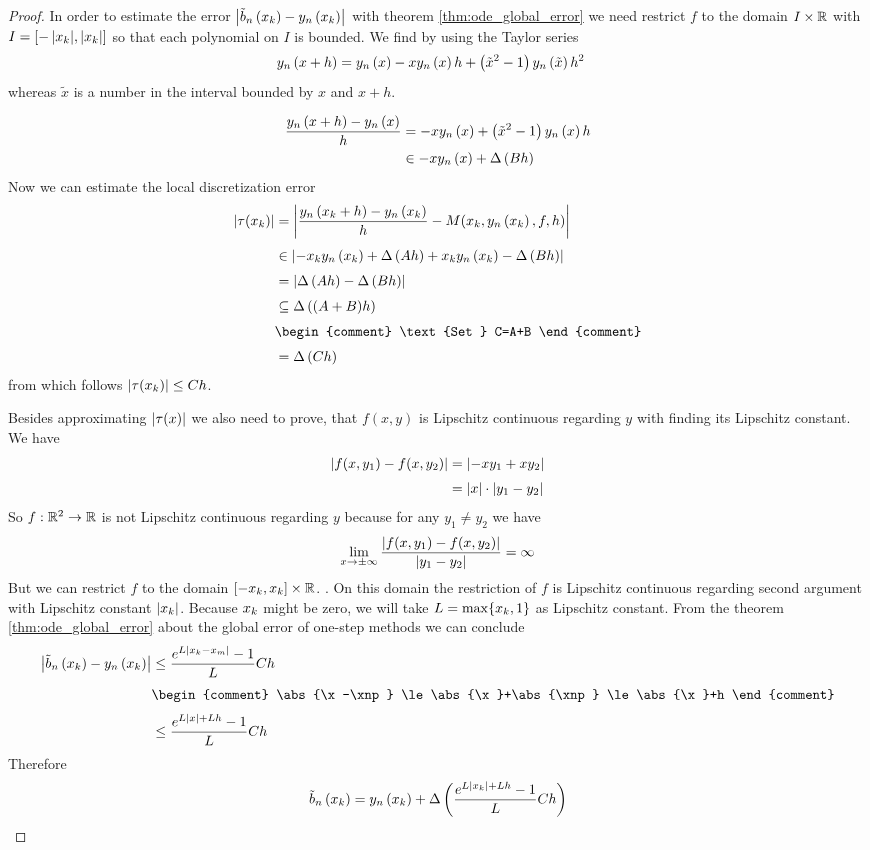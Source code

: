 \begin{proof}
  In order to estimate the error $\left|{\tilde b_{n}\left({x_{k}}\right)-y_{n}\left({x_{k}}\right)}\right|$ with theorem \ref{thm:ode_global_error} we need restrict $f$ to the domain $I\times \mathbb R$ with $I=\left[{-\left|{x_{k}}\right|},{\left|{x_{k}}\right|}\right]$ so that each polynomial on $I$ is bounded. We find by using the Taylor series
  \begin{align}
    & y_{n}\left({x+h}\right) = y_{n}\left({x}\right) -xy_{n}\left({x}\right)h+\left( {\tilde x^2-1} \right)y_{n}\left({\tilde x}\right) h^2
  \end{align}
  whereas $\tilde x$ is a number in the interval bounded by $x$ and $x+h$.

  \begin{align}
    \frac{y_{n}\left({x+h}\right)-y_{n}\left({x}\right)}h &= -xy_{n}\left({x}\right)+\left( {\tilde x^2-1} \right)y_{n}\left({x}\right) h \\
    &\in -xy_{n}\left({x}\right) + \Delta\left( {Bh} \right)
  \end{align}
  Now we can estimate the local discretization error
  \begin{align}
    \abs{\tau(\x)} &= \abs{\frac{\phin{\x[k]+h}-\phin{\x}}h -  M(\x,\phin{\x},f,h)} \nl
    &\in \abs{-\x\phin{\x} + \bigabs{Ah} +\x\phin{\x} - \bigabs{Bh}} \nl
    &= \abs{\bigabs{Ah}-\bigabs{Bh}} \nl
    &\subseteq \bigabs{(A+B)h} \nl
    &
    \begin{comment}
      \text{Set } C=A+B
    \end{comment} \nl
    &= \bigabs{Ch}
  \end{align}
  from which follows $\left|{\tau(x_{k})}\right| \le Ch$.

  Besides approximating $\left|{\tau(x)}\right|$ we also need to prove, that $f(x,y)$ is Lipschitz continuous regarding $y$ with finding its Lipschitz constant. We have
  \begin{align}
    \abs{f(x,y_1)-f(x,y_2)} &= \abs{-xy_1+xy_2} \nl
    &= \abs{x} \cdot \abs{y_1-y_2}
  \end{align}
  So $f:\mathbb R^2\to\mathbb R$ is not Lipschitz continuous regarding $y$ because for any $y_1\neq y_2$ we have
  \begin{align}
    \lim_{x\to\pm\infty} \frac{\left|{f(x,y_1)-f(x,y_2)}\right|}{\left|{y_1-y_2}\right|} = \infty
  \end{align}
  But we can restrict $f$ to the domain $\left[{-x_{k}},{x_{k}}\right]\times \mathbb R$. . On this domain the restriction of $f$ is Lipschitz continuous regarding second argument with Lipschitz constant $\left|{x_{k}}\right|$. Because $x_{k}$ might be zero, we will take $L=\max\{x_{k},1\}$ as Lipschitz constant. From the theorem \ref{thm:ode_global_error} about the global error of one-step methods we can conclude
  \begin{align}
    \abs{\bb{\x}-\phin{\x}} &\le \frac{\fe{L\abs{\x-\xnp}}-1}L Ch \nl
    &
    \begin{comment}
      \abs{\x-\xnp} \le \abs{\x}+\abs{\xnp} \le \abs{\x}+h
    \end{comment} \nl
    &\le \frac{\fe{L\abs{x}+Lh}-1}L Ch
  \end{align}
  Therefore
  \begin{align}
    \tilde b_{n}\left({x_{k}}\right) = y_{n}\left({x_{k}}\right) + \Delta\left( {\frac{e^{L\left|{x_{k}}\right|+Lh}-1}L Ch} \right)
  \end{align}
\end{proof}

